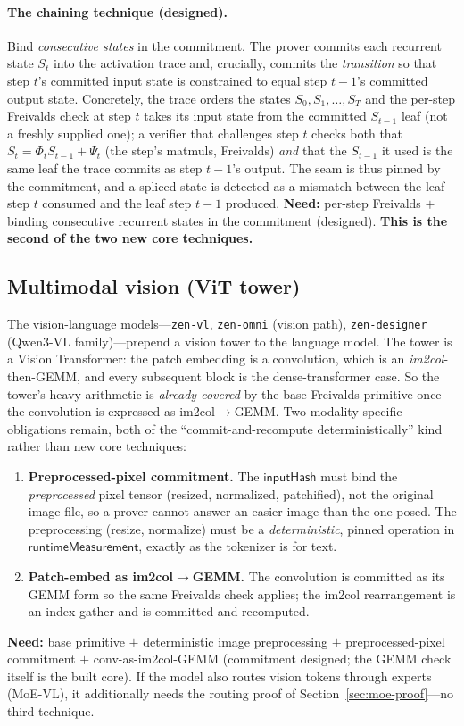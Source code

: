 \paragraph{The chaining technique (designed).} Bind \emph{consecutive states} in the
commitment. The prover commits each recurrent state $S_t$ into the activation trace and,
crucially, commits the \emph{transition} so that step $t$'s committed input state is
constrained to equal step $t-1$'s committed output state. Concretely, the trace orders
the states $S_0, S_1, \ldots, S_T$ and the per-step Freivalds check at step $t$ takes its
input state from the committed $S_{t-1}$ leaf (not a freshly supplied one); a verifier
that challenges step $t$ checks both that $S_t = \Phi_t S_{t-1} + \Psi_t$ (the step's
matmuls, Freivalds) \emph{and} that the $S_{t-1}$ it used is the same leaf the trace
commits as step $t-1$'s output. The seam is thus pinned by the commitment, and a spliced
state is detected as a mismatch between the leaf step $t$ consumed and the leaf step
$t-1$ produced. \textbf{Need:} per-step Freivalds $+$ binding consecutive recurrent states
in the commitment (designed). \textbf{This is the second of the two new core techniques.}

\subsection{Multimodal vision (ViT tower)}
\label{sec:vision}

The vision-language models---\texttt{zen-vl}, \texttt{zen-omni} (vision path),
\texttt{zen-designer} (Qwen3-VL family)---prepend a vision tower to the language model. The
tower is a Vision Transformer: the patch embedding is a convolution, which is an
\emph{im2col}-then-GEMM, and every subsequent block is the dense-transformer case. So the
tower's heavy arithmetic is \emph{already covered} by the base Freivalds primitive once the
convolution is expressed as im2col$\to$GEMM. Two modality-specific obligations remain, both
of the ``commit-and-recompute deterministically'' kind rather than new core techniques:

\begin{enumerate}[leftmargin=1.6em]
\item \textbf{Preprocessed-pixel commitment.} The $\mathsf{inputHash}$ must bind the
\emph{preprocessed} pixel tensor (resized, normalized, patchified), not the original
image file, so a prover cannot answer an easier image than the one posed. The
preprocessing (resize, normalize) must be a \emph{deterministic}, pinned operation in
$\mathsf{runtimeMeasurement}$, exactly as the tokenizer is for text.
\item \textbf{Patch-embed as im2col$\to$GEMM.} The convolution is committed as its GEMM
form so the same Freivalds check applies; the im2col rearrangement is an index gather and
is committed and recomputed.
\end{enumerate}
\textbf{Need:} base primitive $+$ deterministic image preprocessing $+$ preprocessed-pixel
commitment $+$ conv-as-im2col-GEMM (commitment designed; the GEMM check itself is the built
core). If the model also routes vision tokens through experts (MoE-VL), it additionally
needs the routing proof of Section~\ref{sec:moe-proof}---no third technique.

